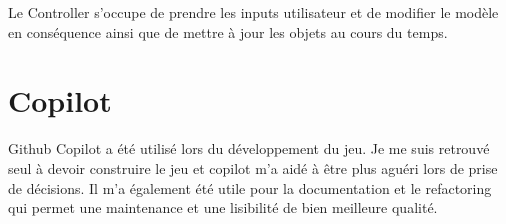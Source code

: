 \documentclass{article}
\begin{document}
Le Controller s'occupe de prendre les inputs utilisateur et de modifier le modèle en conséquence ainsi que de mettre à jour les objets au cours du temps.

\section{Copilot}

Github Copilot a été utilisé lors du développement du jeu. Je me suis retrouvé seul à devoir construire le jeu et copilot m'a aidé à être plus aguéri lors de prise de décisions. 
Il m'a également été utile pour la documentation et le refactoring qui permet une maintenance et une lisibilité de bien meilleure qualité.

\end{document}
